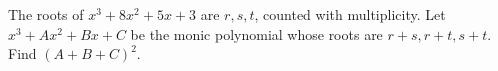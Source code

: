 The roots of $x^3+8x^2+5x+3$ are $r,s,t$, counted with multiplicity. Let $x^3+Ax^2+Bx+C$ be the monic polynomial whose roots are $r+s,r+t,s+t$. Find $(A+B+C)^2$.
